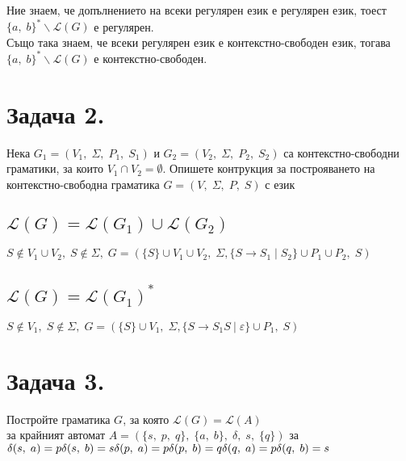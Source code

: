 \documentclass[12pt]{article}
\newcommand{\Lang}{\mathcal{L}}
\begin{document}
Ние знаем, че допълнението на всеки регулярен език е регулярен език, тоест $\{a, \; b\}^* \backslash \Lang(G)$ е регулярен. \\

Също така знаем, че всеки регулярен език е контекстно-свободен език, тогава $\{a, \; b\}^* \backslash \Lang(G)$ е контекстно-свободен.

\section{Задача 2.}

Нека $G_1 = (V_1, \; \Sigma, \; P_1, \; S_1)$ и $G_2 = (V_2, \; \Sigma, \; P_2, \; S_2)$
са контекстно-свободни граматики, за които $V_1 \cap V_2 = \emptyset$. Опишете
контрукция за построяването на контекстно-свободна граматика $G = (V, \; \Sigma, \; P, \; S)$ с език

\subsection{$\Lang(G) = \Lang(G_1) \cup \Lang(G_2)$}

$S \notin V_1 \cup V_2, \; S \notin \Sigma, \; G = (\{S\} \cup V_1 \cup V_2, \; \Sigma, \{S \to S_1 \; | \; S_2\} \cup P_1 \cup P_2, \; S)$

\subsection{$\Lang(G) = \Lang(G_1)^*$}

$S \notin V_1, \; S \notin \Sigma, \; G = (\{S\} \cup V_1, \; \Sigma, \{S \to S_1S \: | \; \varepsilon\} \cup P_1, \; S)$

\section{Задача 3.}

Постройте граматика $G$, за която $\Lang(G) = \Lang(A)$ \\

за крайният автомат $A = (\{s, \; p, \; q\}, \; \{a, \; b\}, \; \delta, \; s, \; \{q\})$ за \\

$\delta(s, \; a) = p \\\\
\delta(s, \; b) = s \\\\
\delta(p, \; a) = p \\\\
\delta(p, \; b) = q \\\\
\delta(q, \; a) = p \\\\
\delta(q, \; b) = s$ \\
\end{document}
